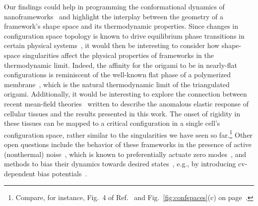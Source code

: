 Our findings could help in programming the conformational dynamics of nanoframeworks~\cite{dunn2015} and highlight the interplay between the geometry of a framework's shape space and its thermodynamic properties.
Since changes in configuration space topology is known to drive equilibrium phase transitions in certain physical systems~\cite{kastner2008}, it would then be interesting to consider how shape-space singularities affect the physical properties of frameworks in the thermodynamic limit.
Indeed, the affinity for the origami to be in nearly-flat configurations is reminiscent of the well-known flat phase of a polymerized membrane~\cite{abraham1990,bowick1996}, which is the natural thermodynamic limit of the triangulated origami.
Additionally, it would be interesting to explore the connection between recent mean-field theories~\cite{hernandez2022} written to describe the anomalous elastic response of cellular tissues and the results presented in this work.
The onset of rigidity in these tissues can be mapped to a critical configuration in a single cell's configuration space, rather similar to the singularities we have seen so far.\footnote{Compare, for instance, Fig.~4 of Ref.~\cite{hernandez2022} and Fig.~\ref{fig:confspaces}(c) on page~\pageref{fig:confspaces}.}
Other open questions include the behavior of these frameworks in the presence of active (nonthermal) noise~\cite{gandikota2023,gandikota2023a}, which is known to preferentially actuate zero modes~\cite{woodhouse2018}, and methods to bias their dynamics towards desired states~\cite{kang2019}, e.g., by introducing \ac{cv}-dependent bias potentials~\cite{kastner2011}.

